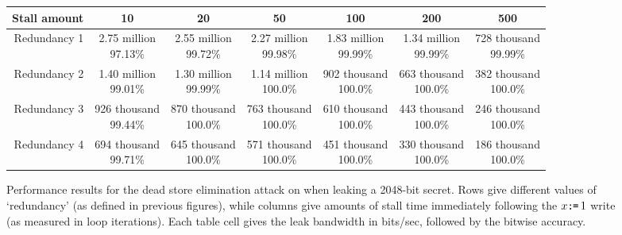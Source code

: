 \begin{figure}
  \small
  \begin{tabular}{ r | c | c | c | c | c | c }
    Stall amount & 10 & 20 & 50 & 100 & 200 & 500 \\ \hline
    Redundancy 1 & \makecell{2.75 million\\97.13\%} &
                   \makecell{2.55 million\\99.72\%} &
                   \makecell{2.27 million\\99.98\%} &
                   \makecell{1.83 million\\99.99\%} &
                   \makecell{1.34 million\\99.99\%} &
                   \makecell{728 thousand\\99.99\%} \\ \hline
    Redundancy 2 & \makecell{1.40 million\\99.01\%} &
                   \makecell{1.30 million\\99.99\%} &
                   \makecell{1.14 million\\100.0\%} &
                   \makecell{902 thousand\\100.0\%} &
                   \makecell{663 thousand\\100.0\%} &
                   \makecell{382 thousand\\100.0\%} \\ \hline
    Redundancy 3 & \makecell{926 thousand\\99.44\%} &
                   \makecell{870 thousand\\100.0\%} &
                   \makecell{763 thousand\\100.0\%} &
                   \makecell{610 thousand\\100.0\%} &
                   \makecell{443 thousand\\100.0\%} &
                   \makecell{246 thousand\\100.0\%} \\ \hline
    Redundancy 4 & \makecell{694 thousand\\99.71\%} &
                   \makecell{645 thousand\\100.0\%} &
                   \makecell{571 thousand\\100.0\%} &
                   \makecell{451 thousand\\100.0\%} &
                   \makecell{330 thousand\\100.0\%} &
                   \makecell{186 thousand\\100.0\%} \\
  \end{tabular}
  \caption{
    Performance results for the dead store elimination attack on {\GCC} when
    leaking a 2048-bit secret.
    Rows give different values of `redundancy' (as defined in previous figures),
    while columns give amounts of stall time immediately following the
    $x\texttt{:}\mkern-1mu\texttt{=}\, 1$ write (as measured in loop iterations).
    Each table cell gives the leak bandwidth in bits/sec, followed by the
    bitwise accuracy.
  }
  \label{fig:gcc-dse-perf}
\end{figure}

